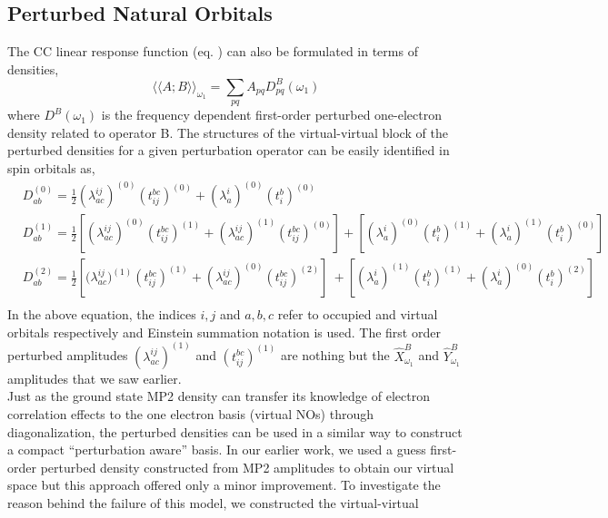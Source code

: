 \subsection{Perturbed Natural Orbitals}
The CC linear response function (eq. ) can also be formulated in terms of densities,
\begin{equation}
{\langle\langle A;B\rangle\rangle}_{\omega_1} =  \sum_{pq} A_{pq}D^{B}_{pq}(\omega_1)
\end{equation}
where $D^{B}(\omega_1)$ is the frequency dependent first-order
perturbed one-electron density related to operator B. The structures  
of the virtual-virtual block of the perturbed densities for a given
perturbation operator can be easily identified in spin orbitals as,
\begin{equation}
\begin{split}
& D^{(0)}_{ab} = \frac{1}{2}(\lambda^{ij}_{ac})^{(0)}(t^{bc}_{ij})^{(0)} + (\lambda^{i}_{a})^{(0)}(t^{b}_{i})^{(0)} \\
&D^{(1)}_{ab} = \frac{1}{2}[(\lambda^{ij}_{ac})^{(0)}(t^{bc}_{ij})^{(1)} + (\lambda^{ij}_{ac})^{(1)}(t^{bc}_{ij})^{(0)}] + [(\lambda^{i}_{a})^{(0)}(t^{b}_{i})^{(1)} + (\lambda^{i}_{a})^{(1)}(t^{b}_{i})^{(0)}] \\
&D^{(2)}_{ab} = \frac{1}{2}[{(\lambda^{ij}_{ac}})^{(1)}(t^{bc}_{ij})^{(1)} + (\lambda^{ij}_{ac})^{(0)}(t^{bc}_{ij})^{(2)}]
\ + [(\lambda^{i}_{a})^{(1)} (t^{b}_{i})^{(1)} + (\lambda^{i}_{a})^{(0)}(t^{b}_{i})^{(2)}]\\
\end{split}
\end{equation}
In the above equation, the indices $i,j$ and $a,b,c$ refer to occupied and virtual orbitals respectively
and Einstein summation notation is used. The first order perturbed amplitudes $(\lambda^{ij}_{ac})^{(1)}$ 
and $(t^{bc}_{ij})^{(1)}$ are nothing but the $\hat{X}^{B}_{\omega_1}$ and $\hat{Y}^{B}_{\omega_1}$ 
amplitudes that we saw earlier.\\ Just as the ground state MP2 density can transfer its knowledge of 
electron correlation effects to the one electron basis (virtual NOs) through diagonalization, 
the perturbed densities can be used in a similar way to construct a compact ``perturbation aware''
basis. In our earlier work, we used a guess first-order perturbed density constructed from MP2 amplitudes
to obtain our virtual space but this approach offered only a minor improvement\cite{}.
To investigate the reason behind the failure of this model, we constructed the virtual-virtual
